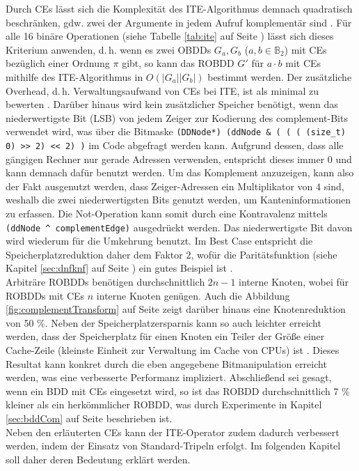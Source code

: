 Durch CEs lässt sich die Komplexität des ITE-Algorithmus demnach quadratisch beschränken, gdw. zwei der Argumente in jedem Aufruf komplementär sind \cite[S.119-121]{mt1998}. Für alle 16 binäre Operationen (siehe Tabelle \ref{tab:ite} auf Seite \pageref{tab:ite}) lässt sich dieses Kriterium anwenden, d.\,h. wenn es zwei OBDDs $G_a, G_b$ ($a, b \in \mathbb{B}_2$) mit CEs bezüglich einer Ordnung $\pi$ gibt, so kann das ROBDD $G'$ für $a \cdot b$ mit CEs mithilfe des ITE-Algorithmus in $O(|G_a||G_b|)$ bestimmt werden. Der zusätzliche Overhead, d.\,h. Verwaltungsaufwand von CEs bei ITE, ist als minimal zu bewerten \cite[S.19-22]{dfe2005}. Darüber hinaus wird kein zusätzlicher Speicher benötigt, wenn das niederwertigste Bit (LSB) von jedem Zeiger zur Kodierung des complement-Bits verwendet wird, was über die Bitmaske \texttt{(DDNode*) (ddNode \& ( (~( (size\_t) 0) >> 2) << 2) )} im Code abgefragt werden kann. Aufgrund dessen, dass alle gängigen Rechner nur gerade Adressen verwenden, entspricht dieses immer $0$ und kann demnach dafür benutzt werden. Um das Komplement anzuzeigen, kann also der Fakt ausgenutzt werden, dass Zeiger-Adressen ein Multiplikator von $4$ sind, weshalb die zwei niederwertigsten Bits genutzt werden, um Kanteninformationen zu erfassen. Die Not-Operation kann somit durch eine Kontravalenz mittels \texttt{(ddNode \^~complementEdge)} ausgedrückt werden. Das niederwertigste Bit davon wird wiederum für die Umkehrung benutzt. Im Best Case entspricht die Speicherplatzreduktion daher dem Faktor $2$, wofür die Paritätsfunktion (siehe Kapitel \ref{sec:dnfknf} auf Seite \pageref{sec:dnfknf}) ein gutes Beispiel ist \cite{brb2007}.\\
Arbiträre ROBDDs benötigen durchschnittlich $2n-1$ interne Knoten, wobei für \\ROBDDs mit CEs $n$ interne Knoten genügen. Auch die Abbildung \ref{fig:complementTransform} auf Seite \pageref{fig:complementTransform} zeigt darüber hinaus eine Knotenreduktion von 50 \%. Neben der Speicherplatzersparnis kann so auch leichter erreicht werden, dass der Speicherplatz für einen Knoten ein Teiler der Größe einer Cache-Zeile (kleinste Einheit zur Verwaltung im Cache von CPUs) ist \cite[S.47]{s2007}. Dieses Resultat kann konkret durch die eben angegebene Bitmanipulation erreicht werden, was eine verbesserte Performanz impliziert. Abschließend sei gesagt, wenn ein BDD mit CEs eingesetzt wird, so ist das ROBDD durchschnittlich 7 \% kleiner als ein herkömmlicher ROBDD, was durch Experimente in Kapitel \ref{sec:bddCom} auf Seite \pageref{sec:bddCom} beschrieben ist.\\
Neben den erläuterten CEs kann der ITE-Operator zudem dadurch verbessert werden, indem der Einsatz von Standard-Tripeln erfolgt. Im folgenden Kapitel soll daher deren Bedeutung erklärt werden.

